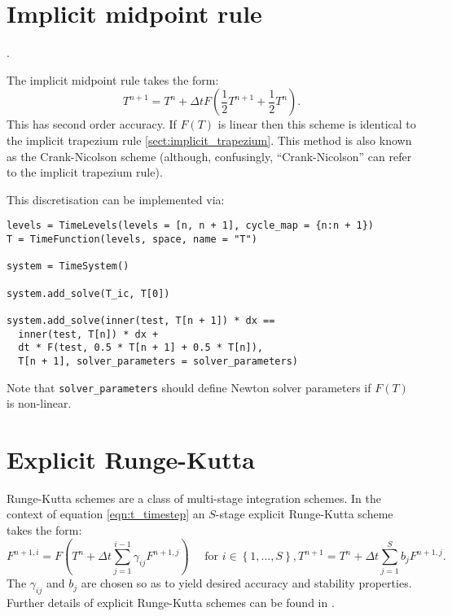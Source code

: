 \documentclass[a4paper]{book}
\begin{document}
\section{Implicit midpoint rule}\label{sect:implicit_midpoint}.

The implicit midpoint rule takes the form:
\begin{equation}
  T^{n + 1} = T^n + \Delta t F \left( \frac{1}{2} T^{n + 1} + \frac{1}{2} T^n \right).
\end{equation}
This has second order accuracy. If $F(T)$ is linear then this scheme is
identical to the implicit trapezium rule \ref{sect:implicit_trapezium}. This
method is also known as the Crank-Nicolson scheme
\citep[e.g.][section 2.22]{mitchell1980} (although, confusingly,
``Crank-Nicolson'' can refer to the implicit trapezium rule).

This discretisation can be implemented via:
\begin{lstlisting}
levels = TimeLevels(levels = [n, n + 1], cycle_map = {n:n + 1})
T = TimeFunction(levels, space, name = "T")

system = TimeSystem()

system.add_solve(T_ic, T[0])

system.add_solve(inner(test, T[n + 1]) * dx ==
  inner(test, T[n]) * dx +
  dt * F(test, 0.5 * T[n + 1] + 0.5 * T[n]),
  T[n + 1], solver_parameters = solver_parameters)
\end{lstlisting}
Note that \verb+solver_parameters+ should define Newton solver parameters if
$F(T)$ is non-linear.

\section{Explicit Runge-Kutta}

Runge-Kutta schemes are a class of multi-stage integration schemes. In the
context of equation \eqref{eqn:t_timestep} an $S$-stage explicit Runge-Kutta
scheme takes the form:
\begin{subequations}
  \begin{equation}
    F^{n + 1,i} = F \left( T^n + \Delta t \sum_{j = 1}^{i - 1} \gamma_{ij} F^{n + 1,j} \right) \quad \textrm{ for } i \in \left\{ 1, \ldots, S \right\},
  \end{equation}
  \begin{equation}
    T^{n + 1} = T^n + \Delta t \sum_{j = 1}^S b_j F^{n + 1,j}.
  \end{equation}
\end{subequations}
The $\gamma_{ij}$ and $b_j$ are chosen so as to yield desired accuracy and
stability properties. Further details of explicit Runge-Kutta schemes can be
found in \citet[section 3.2]{iserles2009}.
\end{document}
